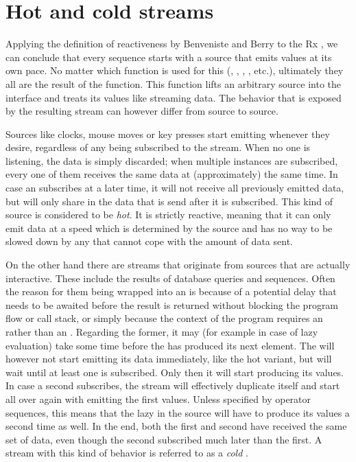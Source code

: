 \section{Hot and cold streams}
Applying the definition of reactiveness by Benveniste and Berry \cite{berry1991-Reactive} to the Rx \obs, we can conclude that every \obs sequence starts with a source that emits values at its own pace. No matter which function is used for this (, , , , etc.), ultimately they all are the result of the  function. This function lifts an arbitrary source into the \obs interface and treats its values like streaming data. The behavior that is exposed by the resulting stream can however differ from source to source.

Sources like clocks, mouse moves or key presses start emitting whenever they desire, regardless of any \obv being subscribed to the stream. When no one is listening, the data is simply discarded; when multiple \obv instances are subscribed, every one of them receives the same data at (approximately) the same time. In case an \obv subscribes at a later time, it will not receive all previously emitted data, but will only share in the data that is send after it is subscribed. This kind of source is considered to be \textit{hot}. It is strictly reactive, meaning that it can only emit data at a speed which is determined by the source and has no way to be slowed down by any \obv that cannot cope with the amount of data sent.

On the other hand there are streams that originate from sources that are actually interactive. These include the results of database queries and \ieb sequences. Often the reason for them being wrapped into an \obs is because of a potential delay that needs to be awaited before the result is returned without blocking the program flow or call stack, or simply because the context of the program requires an \obs rather than an \ieb. Regarding the former, it may (for example in case of lazy evaluation) take some time before the \ier has produced its next element. The \obs will however not start emitting its data immediately, like the hot variant, but will wait until at least one \obv is subscribed. Only then it will start producing its values. In case a second \obv subscribes, the stream will effectively duplicate itself and start all over again with emitting the first values. Unless specified by operator sequences, this means that the lazy \ier in the source will have to produce its values a second time as well. In the end, both the first and second \obv have received the same set of data, even though the second subscribed much later than the first. A stream with this kind of behavior is referred to as a \textit{cold} \obs.

